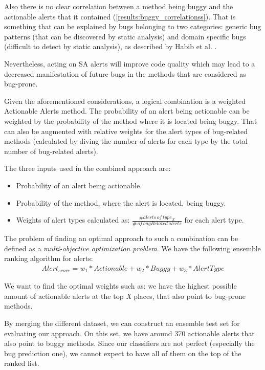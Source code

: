 Also there is no clear correlation between a method being buggy and the actionable alerts that it contained (\cref{results:buggy_correlationss}). That is something that can be explained by bugs belonging to two categories: generic bug patterns (that can be discovered by static analysis) and domain specific bugs (difficult to detect by static analysis), as described by Habib et al. \cite{how_many_bugs}.

Nevertheless, acting on SA alerts will improve code quality which may lead to a decreased manifestation of future bugs in the methods that are considered as bug-prone.

Given the aforementioned considerations, a logical combination is a weighted Actionable Alerts method. The probability of an alert being actionable can be weighted by the probability of the method where it is located being buggy. That can also be augmented with relative weights for the alert types of bug-related methods (calculated by diving the number of alerts for each type by the total number of bug-related alerts).

The three inputs used in the combined approach are:
\begin{itemize}
	\item Probability of an alert being actionable.
	\item Probability of the method, where the alert is located, being buggy.
	\item Weights of alert types calculated as: $\frac{\#alerts \, of \, type_X}{\# \, of \, bugRelated \, alerts}$ for each alert type.
\end{itemize}

The problem of finding an optimal approach to such a combination can be defined as a \textit{multi-objective optimization problem}. We have the following ensemble ranking algorithm for alerts:
\begin{gather*}
Alert_{score} = w_{1} * Actionable + w_{2} * Buggy + w_{3} * AlertType
\end{gather*}

We want to find the optimal weights such as: we have the highest possible amount of actionable alerts at the top \textit{X} places, that also point to bug-prone methods.

By merging the different dataset, we can construct an ensemble test set for evaluating our approach. On this set, we have around 370 actionable alerts that also point to buggy methods. Since our classifiers are not perfect (especially the bug prediction one), we cannot expect to have all of them on the top of the ranked list.

